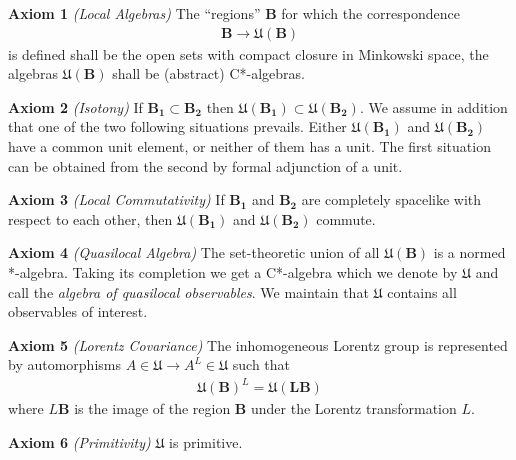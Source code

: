 \noindent \textbf{Axiom 1} \textit{(Local Algebras)} The ``regions'' $\mathbf{B}$ for which the correspondence
\begin{align}
    \mathbf{B} \rightarrow \mathfrak{U}(\mathbf{B})
\end{align}
is defined shall be the open sets with compact closure in Minkowski space, the algebras $\mathfrak{U}(\mathbf{B})$ shall be (abstract) C*-algebras.

\noindent \textbf{Axiom 2} \textit{(Isotony)} If $\mathbf{B_1} \subset \mathbf{B_2}$ then $\mathfrak{U}(\mathbf{B_1}) \subset \mathfrak{U}(\mathbf{B_2})$. We assume in addition that one of the two following situations prevails. Either $\mathfrak{U}(\mathbf{B_1})$ and $\mathfrak{U}(\mathbf{B_2})$ have a common unit element, or neither of them has a unit. The first situation can be obtained from the second by formal adjunction of a unit.

\noindent \textbf{Axiom 3} \textit{(Local Commutativity)} If $\mathbf{B_1}$ and $\mathbf{B_2}$ are completely spacelike with respect to each other, then $\mathfrak{U}(\mathbf{B_1})$ and $\mathfrak{U}(\mathbf{B_2})$ commute.

\noindent \textbf{Axiom 4} \textit{(Quasilocal Algebra)} The set-theoretic union of all $\mathfrak{U}(\mathbf{B})$ is a normed *-algebra. Taking its completion we get a C*-algebra which we denote by $\mathfrak{U}$ and call the \textit{algebra of quasilocal observables}. We maintain that $\mathfrak{U}$ contains all observables of interest.

\noindent \textbf{Axiom 5} \textit{(Lorentz Covariance)} The inhomogeneous Lorentz group is represented by automorphisms $A \in \mathfrak{U} \rightarrow A^L \in \mathfrak{U}$ such that
\begin{align}
\mathfrak{U}(\mathbf{B})^L = \mathfrak{U}(\mathbf{LB})
\end{align}
where $L\mathbf{B}$ is the image of the region $\mathbf{B}$ under the Lorentz transformation $L$.

\noindent \textbf{Axiom 6} \textit{(Primitivity)} $\mathfrak{U}$ is primitive.
